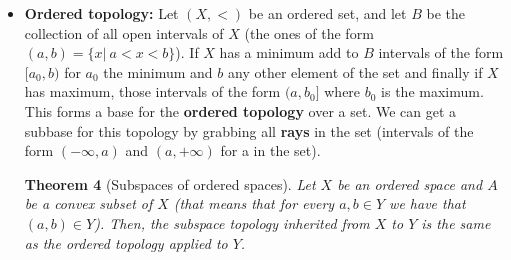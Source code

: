 \documentclass[a4paper]{article}
\newtheorem{theorem}{Theorem}[section]
\begin{document}
\begin{itemize}
\begin{theorem}[Closed sets in subspaces]
Let $Y$ be a subspace in $X$. Then a subset $A\subseteq Y$ is closed iff it is the intersection of a closed set in $X$ with $Y$.
\end{theorem}

\begin{theorem}[Closure in subspaces]
Let $Y$ be a subspace in $X$ and $A\subseteq Y$. Then $\bar{A}$ in $Y$ is equal to $\bar{A}\cap Y$ where this closure is in $X$.
\end{theorem}
We have to be careful whenever we are talking about an space and a subspace of it: a set may be closed or open in the subspace but not be in $X$, or viceversa.

\begin{theorem}[Subspaces of Hausdorff spaces]
If $X$ is a Hausdorff space, then any subspace of it is a Hausdorff space.
\end{theorem}

\item
\textbf{Ordered topology: }Let $(X, <)$ be an ordered set, and let $B$ be the collection of all open intervals of $X$ (the ones of the form $(a, b)= \{x|\ a<x<b\}$). If $X$ has a minimum add to $B$ intervals of the form $[a_{0}, b)$ for $a_{0}$ the minimum and $b$ any other element of the set and finally if $X$ has maximum, those intervals of the form $(a, b_{0}]$ where $b_{0}$ is the maximum. This forms a base for the \textbf{ordered topology} over a set. We can get a subbase for this topology by grabbing all \textbf{rays} in the set (intervals of the form $(-\infty, a)$ and $(a, +\infty)$ for a in the set).

\begin{theorem}[Subspaces of ordered spaces]
Let $X$ be an ordered space and $A$ be a convex subset of $X$ (that means that for every $a,b\in Y$ we have that $(a,b)\in Y$). Then, the subspace topology inherited from $X$ to $Y$ is the same as the ordered topology applied to $Y$.
\end{theorem}


\end{itemize}
\end{document}
